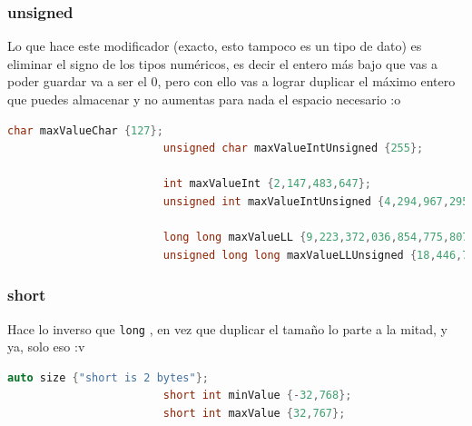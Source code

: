 \documentclass[12pt, fleqn]{report}                             %
\theoremstyle{break}                                            %
\newcommand{\textCode}[1]  { \texttt{#1} }                      %
\begin{document}
                \subsubsection{unsigned}

                    Lo que hace este modificador (exacto, esto tampoco es un tipo de dato)
                    es eliminar el signo de los tipos numéricos, es decir el entero más bajo que vas
                    a poder guardar va a ser el 0, pero con ello vas a lograr duplicar
                    el máximo entero que puedes almacenar y no aumentas para nada el espacio necesario :o
                    \begin{lstlisting}[language=C++, gobble=24]
                        char maxValueChar {127};                    
                        unsigned char maxValueIntUnsigned {255};
                        
                        int maxValueInt {2,147,483,647};                    
                        unsigned int maxValueIntUnsigned {4,294,967,295};
                        
                        long long maxValueLL {9,223,372,036,854,775,807};                    
                        unsigned long long maxValueLLUnsigned {18,446,744,073,709,551,615};
                    \end{lstlisting}


                \subsubsection{short}

                    Hace lo inverso que \textCode{long}, en vez que duplicar el tamaño lo parte a la mitad,
                    y ya, solo eso :v

                    \begin{lstlisting}[language=C++, gobble=24]
                        auto size {"short is 2 bytes"};
                        short int minValue {-32,768};
                        short int maxValue {32,767};
                    \end{lstlisting}
                
\end{document}
